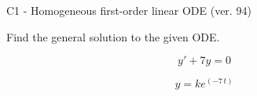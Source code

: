 \begin{exercise}
  \begin{exerciseTitle}C1 - Homogeneous first-order linear ODE (ver. 94)\end{exerciseTitle}
  \begin{exerciseStatement}
    
Find the general solution to the given ODE.

    
\[y'+7y=0\]

  \end{exerciseStatement}
  \begin{exerciseAnswer}
    
\[y= k e^{\left(-7 \, t\right)}\]

  \end{exerciseAnswer}
\end{exercise}